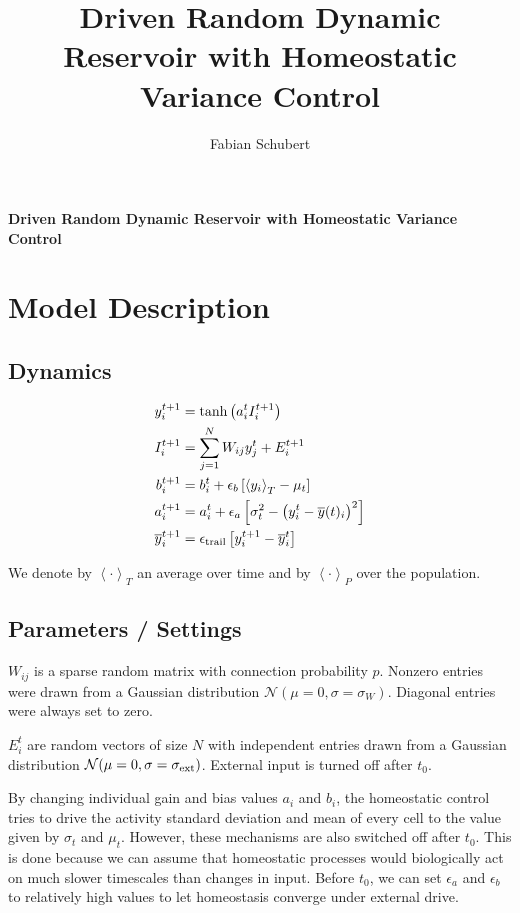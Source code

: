\documentclass[10pt,a4paper]{article}
\author{Fabian Schubert}
\title{Driven Random Dynamic Reservoir with Homeostatic Variance Control}
\newcommand{\avgt}[1]{\left< #1 \right>_T}
\newcommand{\avgp}[1]{\left< #1 \right>_P}
\begin{document}
\begin{center}
\begin{LARGE}
\textbf{Driven Random Dynamic Reservoir with Homeostatic Variance Control}\\
\end{LARGE}
\end{center}

\section{Model Description}

\subsection{Dynamics}
\begin{align}
y_i^{t+1} &= \mathrm{tanh}\left( a_i^t I_i^{t+1} \right) \label{eq:reserv_dynamics}\\
I_i^{t+1} &= \sum_{j=1}^{N} W_{ij} y_j^t + E_i^{t+1} \label{eq:input_dynamics} \\
b_i^{t+1} &= b_i^t + \epsilon_{b} \left[ \avgt{y_i} - \mu_{t} \right] \\
a_i^{t+1} &= a_i^{t} + \epsilon_{a} \left[ \sigma_{t}^2 - \left( y_i^t - \overline{y}(t)_i\right)^2 \right] \label{eq:gain_dynamcis} \\
\overline{y}^{t+1}_i &= \epsilon_{\rm trail} \left[ y_i^{t+1} - \overline{y}^{t}_i\right]
\end{align}

We denote by $\avgt{\cdot}$ an average over time and by $\avgp{\cdot}$ over the population.

\subsection{Parameters / Settings}

$W_{ij}$ is a sparse random matrix with connection probability $p$. Nonzero entries were drawn from a Gaussian distribution $\mathcal{N}(\mu = 0,\sigma = \sigma_{W})$. Diagonal entries were always set to zero.


$E^t_{i}$ are random vectors of size $N$ with independent entries drawn from a Gaussian distribution $\mathcal{N}(\mu = 0,\sigma = \sigma_{\rm ext})$. External input is turned off after $t_0$.

By changing individual gain and bias values $a_i$ and $b_i$, the homeostatic control tries to drive the activity standard deviation and mean of every cell to the value given by $\sigma_{t}$ and $\mu_{t}$. However, these mechanisms are also switched off after $t_0$. This is done because we can assume that homeostatic processes would biologically act on much slower timescales than changes in input. Before $t_0$, we can set $\epsilon_{a}$ and $\epsilon_{b}$ to relatively high values to let homeostasis converge under external drive.
\end{document}
